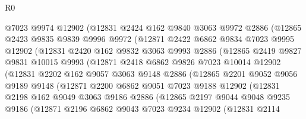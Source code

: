 \begin{lexlean}{R0}
\begin{coremodule}
            @7023
            @9974
            @12902
            (@12831
              @2424
              @162
              @9840
              @3063
              @9972
              @2886
              (@12865
                @2423
                @9835
                @9839
                @9996
                @9972
                (@12871
                  @2422
                  @6862
                  @9834
                  @7023
                  @9995
                  @12902
                  (@12831
                    @2420
                    @162
                    @9832
                    @3063
                    @9993
                    @2886
                    (@12865
                      @2419
                      @9827
                      @9831
                      @10015
                      @9993
                      (@12871
                        @2418
                        @6862
                        @9826
                        @7023
                        @10014
                        @12902
                        (@12831
                          @2202
                          @162
                          @9057
                          @3063
                          @9148
                          @2886
                          (@12865
                            @2201
                            @9052
                            @9056
                            @9189
                            @9148
                            (@12871
                              @2200
                              @6862
                              @9051
                              @7023
                              @9188
                              @12902
                              (@12831
                                @2198
                                @162
                                @9049
                                @3063
                                @9186
                                @2886
                                (@12865
                                  @2197
                                  @9044
                                  @9048
                                  @9235
                                  @9186
                                  (@12871
                                    @2196
                                    @6862
                                    @9043
                                    @7023
                                    @9234
                                    @12902
                                    (@12831
                                      @2114

\end{coremodule}
\end{lexlean}
